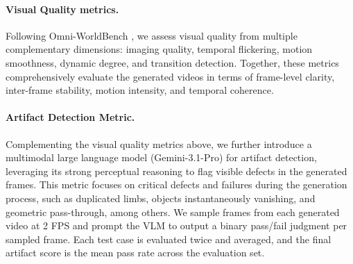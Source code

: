 \documentclass{llmxive}
\begin{document}
\paragraph{\bf{Visual Quality metrics.}}
Following Omni-WorldBench \citep{wu2026omniworldbench}, we assess visual quality from multiple complementary dimensions: imaging quality, temporal flickering, motion smoothness, dynamic degree, and transition detection. Together, these metrics comprehensively evaluate the generated videos in terms of frame-level clarity, inter-frame stability, motion intensity, and temporal coherence.

\paragraph{\bf{Artifact Detection Metric.}}

Complementing the visual quality metrics above, we further introduce a multimodal large language model (Gemini-3.1-Pro) for artifact detection, leveraging its strong perceptual reasoning to flag visible defects in the generated frames. This metric focuses on critical defects and failures during the generation process, such as duplicated limbs, objects instantaneously vanishing, and geometric pass-through, among others. We sample frames from each generated video at 2 FPS and prompt the VLM to output a binary pass/fail judgment per sampled frame. Each test case is evaluated twice and averaged, and the final artifact score is the mean pass rate across the evaluation set.
\end{document}
